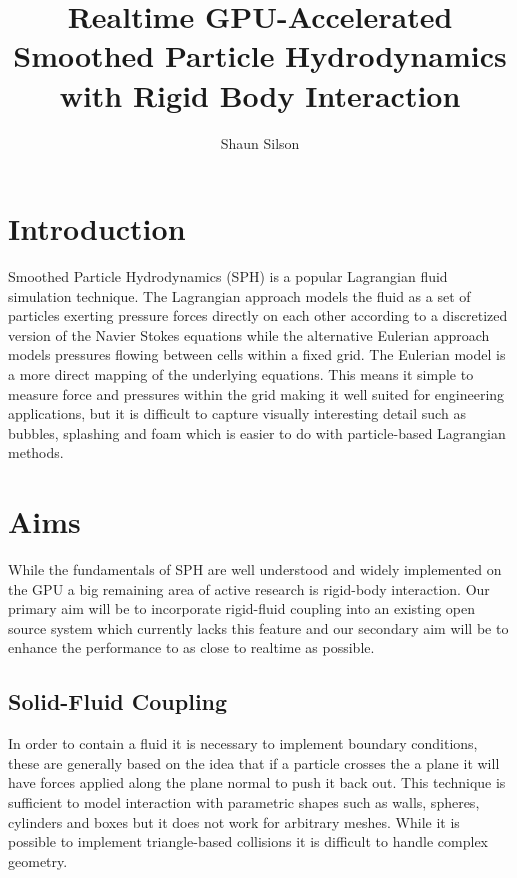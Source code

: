 \documentclass[10pt,a4paper,draft]{article}
\author{Shaun Silson}
\title{Realtime GPU-Accelerated Smoothed Particle Hydrodynamics with Rigid Body Interaction}
\begin{document}
\maketitle

\section{Introduction}
Smoothed Particle Hydrodynamics (SPH) is a popular Lagrangian fluid simulation technique. The Lagrangian approach models the fluid as a set of particles exerting pressure forces directly on each other according to a discretized version of the Navier Stokes equations while the alternative Eulerian approach models pressures flowing between cells within a fixed grid. The Eulerian model is a more direct mapping of the underlying equations. This means it simple to measure force and pressures within the grid making it well suited for engineering applications, but it is difficult to capture visually interesting detail such as bubbles, splashing and foam which is easier to do with particle-based Lagrangian methods.



\section{Aims}
While the fundamentals of SPH are well understood and widely implemented on the GPU a big remaining area of active research is rigid-body interaction.  Our primary aim will be to incorporate rigid-fluid coupling into an existing open source system which currently lacks this feature and our secondary aim will be to enhance the performance to as close to realtime as possible.

 \subsection{Solid-Fluid Coupling}
 In order to contain a fluid it is necessary to implement boundary conditions, these are generally based on the idea that if a particle crosses the a plane it will have forces applied along the plane normal to push it back out. This technique is sufficient to model interaction with parametric shapes such as walls, spheres, cylinders and boxes but it does not work for arbitrary meshes. While it is possible to implement triangle-based collisions it is difficult to handle complex geometry. 
\end{document}
